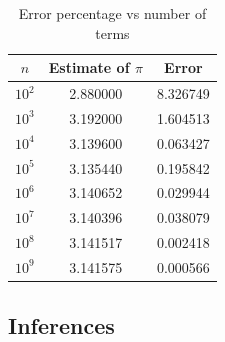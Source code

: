 \documentclass[titlepage, 11pt]{article}
\begin{document}
\begin{table}[!htb]
    \caption{Error percentage vs number of terms}
    \centering
    \begin{tabular}{ccc}
    \toprule
    \textbf{$n$}& \textbf{Estimate of $\pi$}& \textbf{Error}   \\
    \midrule
         $10^2$ & 2.880000	& 8.326749 \\
         $10^3$ & 3.192000 & 1.604513\\
         $10^4$ & 3.139600 & 0.063427 \\
         $10^5$	& 3.135440	& 0.195842 \\
         $10^6$ & 3.140652	& 0.029944 \\
         $10^7$ & 3.140396 & 0.038079 \\
         $10^8$ & 3.141517 & 0.002418 \\
         $10^9$	& 3.141575	& 0.000566 \\
    \bottomrule
    \end{tabular}
    \label{tab:tab2}
\end{table}


\subsection{Inferences}
\end{document}
